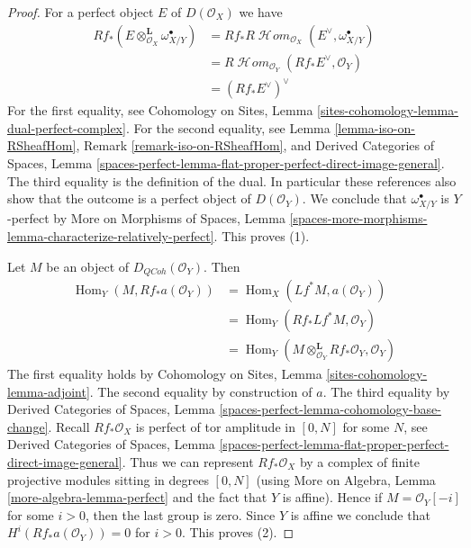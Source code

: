 \documentclass{stacks-project}
\theoremstyle{plain}
\theoremstyle{definition}
\theoremstyle{remark}
\numberwithin{equation}{subsection}
\def\Hom{\mathop{\mathrm{Hom}}\nolimits}
\def\SheafHom{\mathop{\mathcal{H}\!\mathit{om}}\nolimits}
\def\QCoh{\mathit{QCoh}}
\begin{document}
\begin{proof}
For a perfect object $E$ of $D(\mathcal{O}_X)$ we have
\begin{align*}
Rf_*(E \otimes_{\mathcal{O}_X}^\mathbf{L} \omega_{X/Y}^\bullet)
& =
Rf_*R\SheafHom_{\mathcal{O}_X}(E^\vee, \omega_{X/Y}^\bullet) \\
& =
R\SheafHom_{\mathcal{O}_Y}(Rf_*E^\vee, \mathcal{O}_Y) \\
& =
(Rf_*E^\vee)^\vee
\end{align*}
For the first equality, see
Cohomology on Sites, Lemma \ref{sites-cohomology-lemma-dual-perfect-complex}.
For the second equality, see Lemma \ref{lemma-iso-on-RSheafHom},
Remark \ref{remark-iso-on-RSheafHom}, and 
Derived Categories of Spaces, Lemma
\ref{spaces-perfect-lemma-flat-proper-perfect-direct-image-general}.
The third equality is the definition of the dual. In particular
these references also show that the outcome is a perfect object
of $D(\mathcal{O}_Y)$. We conclude that $\omega_{X/Y}^\bullet$
is $Y$-perfect by More on Morphisms of Spaces, Lemma
\ref{spaces-more-morphisms-lemma-characterize-relatively-perfect}.
This proves (1).

\medskip\noindent
Let $M$ be an object of $D_\QCoh(\mathcal{O}_Y)$. Then
\begin{align*}
\Hom_Y(M, Rf_*a(\mathcal{O}_Y)) & =
\Hom_X(Lf^*M, a(\mathcal{O}_Y)) \\
& =
\Hom_Y(Rf_*Lf^*M, \mathcal{O}_Y) \\
& =
\Hom_Y(M \otimes_{\mathcal{O}_Y}^\mathbf{L} Rf_*\mathcal{O}_Y, \mathcal{O}_Y)
\end{align*}
The first equality holds by Cohomology on Sites, Lemma
\ref{sites-cohomology-lemma-adjoint}.
The second equality by construction of $a$.
The third equality by Derived Categories of Spaces, Lemma
\ref{spaces-perfect-lemma-cohomology-base-change}.
Recall $Rf_*\mathcal{O}_X$ is perfect of tor amplitude in $[0, N]$
for some $N$, see
Derived Categories of Spaces, Lemma
\ref{spaces-perfect-lemma-flat-proper-perfect-direct-image-general}.
Thus we can represent $Rf_*\mathcal{O}_X$ by a complex of
finite projective modules sitting in degrees $[0, N]$
(using More on Algebra, Lemma \ref{more-algebra-lemma-perfect}
and the fact that $Y$ is affine).
Hence if $M = \mathcal{O}_Y[-i]$ for some $i > 0$, then the last
group is zero. Since $Y$ is affine we conclude that
$H^i(Rf_*a(\mathcal{O}_Y)) = 0$ for $i > 0$.
This proves (2).


\end{proof}
\end{document}
